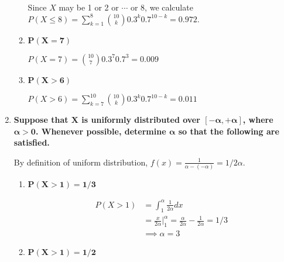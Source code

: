 \documentclass[10pt, oneside]{article}   	%
\theoremstyle{definition}
\begin{document}
\begin{enumerate}[label=4.\arabic*]
\begin{enumerate}
	Since $X$ may be 1 or 2 or $\cdots$ or 8, we calculate $P( X \leq 8) = \sum^8_{k = 1} \binom{10}{k} 0.3^k 0.7^{10-k} = \boxed{0.972}$.
	
	\item  \begin{tcolorbox}[
	  colback=Cerulean!5!white,
	  colframe=Cerulean!75!black]
	\textbf{$\bm{P(X = 7)}$}
	\end{tcolorbox}
	
	$P(X = 7) = \binom{10}{7} 0.3^7 0.7^3 = \boxed{0.009}$
	
	\item  \begin{tcolorbox}[
	  colback=Cerulean!5!white,
	  colframe=Cerulean!75!black]
	\textbf{$\bm{P(X > 6)}$}
	\end{tcolorbox}
	
	$P(X > 6) = \sum^10_{k = 7} \binom{10}{k} 0.3^k 0.7^{10-k} = \boxed{0.011}$
	\end{enumerate}
	
\item  \begin{tcolorbox}[
  colback=Cerulean!5!white,
  colframe=Cerulean!75!black]
\textbf{Suppose that $\bm{X}$ is uniformly distributed over $\bm{[-\alpha, +\alpha]}$, where $\bm{\alpha > 0}$. Whenever possible, determine $\bm{\alpha}$ so that the following are satisfied.}
\end{tcolorbox}

	By definition of uniform distribution, $f(x) = \frac{1}{\alpha - (-\alpha)} = 1/2\alpha$.

	\begin{enumerate}
	\item  \begin{tcolorbox}[
	  colback=Cerulean!5!white,
	  colframe=Cerulean!75!black]
	\textbf{$\bm{P(X > 1) = 1/3}$}
	\end{tcolorbox}
	
	\begin{align*}
	P(X > 1) &= \int^\alpha_1 \frac{1}{2\alpha} dx \\
	&= \frac{x}{2 \alpha} \Big|^\alpha_1 = \frac{\alpha}{2\alpha} - \frac{1}{2\alpha} = 1/3\\
	&\implies \boxed{\alpha = 3}
	\end{align*}
		
	\item  \begin{tcolorbox}[
	  colback=Cerulean!5!white,
	  colframe=Cerulean!75!black]
	\textbf{$\bm{P(X > 1) = 1/2}$}
	\end{tcolorbox}
	

\end{enumerate}
\end{enumerate}
\end{document}
